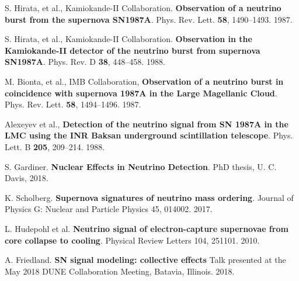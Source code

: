  S. Hirata, et al., Kamiokande-II Collaboration. \textbf{Observation of a neutrino burst from the supernova SN1987A}. Phys. Rev. Lett. \textbf{58}, 1490–1493. 1987.

 S. Hirata, et al., Kamiokande-II Collaboration. \textbf{Observation in the Kamiokande-II detector of the neutrino burst from supernova SN1987A}. Phys. Rev. D \textbf{38}, 448–458. 1988.

 M. Bionta, et al., IMB Collaboration, \textbf{Observation of a neutrino burst in coincidence with supernova 1987A in the Large Magellanic Cloud}. Phys. Rev. Lett. \textbf{58}, 1494–1496. 1987. 

 Alexeyev et al., \textbf{Detection of the neutrino signal from SN 1987A in the LMC using the INR Baksan underground scintillation telescope}. Phys. Lett. B \textbf{205}, 209–214. 1988.

 S. Gardiner. \textbf{Nuclear Effects in Neutrino Detection}. PhD thesis,  U. C. Davis, 2018.

 K. Scholberg. \textbf{Supernova signatures of neutrino mass ordering}. Journal of Physics G: Nuclear and Particle Physics 45, 014002. 2017.

 L. Hudepohl et al. \textbf{Neutrino signal of electron-capture supernovae from core collapse to cooling}. Physical Review Letters 104, 251101. 2010.

 A. Friedland. \textbf{SN signal modeling: collective effects} Talk presented at the May 2018 DUNE Collaboration Meeting, Batavia, Illinois. 2018. 


